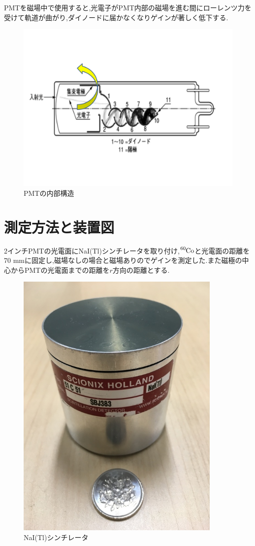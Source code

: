 PMTを磁場中で使用すると,光電子がPMT内部の磁場を進む間にローレンツ力を受けて軌道が曲がり,ダイノードに届かなくなりゲインが著しく低下する.

\begin{figure}[H]
	\centering
		\includegraphics[width=12cm]{fig/iguchi/PMTinner.pdf}
	\caption{PMTの内部構造}
	\label{PMTinner}
\end{figure}



\section{測定方法と装置図}
2インチPMTの光電面にNaI(Tl)シンチレータを取り付け,$\ce{^{60}Co}$と光電面の距離を70 mmに固定し,磁場なしの場合と磁場ありのでゲインを測定した.また磁極の中心からPMTの光電面までの距離を$r$方向の距離とする.

\begin{figure}[htb]
	\centering
		\includegraphics[width=10cm]{fig/iguchi/NaIscinti.jpg}
	\caption{NaI(Tl)シンチレータ}
	\label{NaIscinti}
\end{figure}

